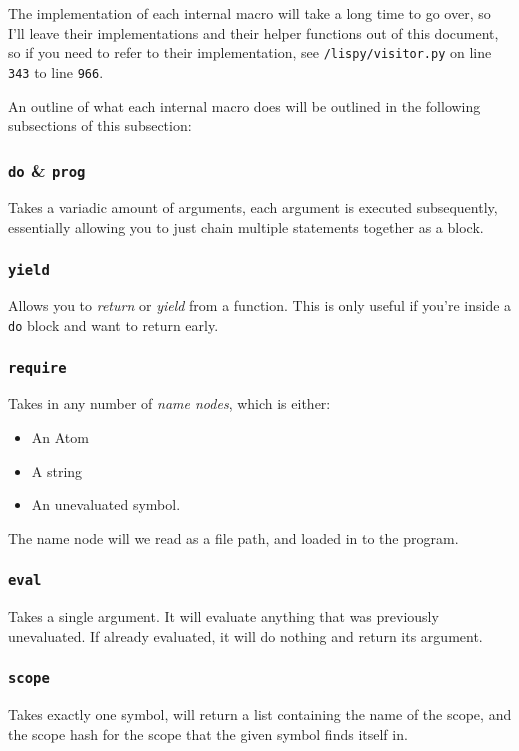 \documentclass{article}
\newcommand{\code}[1]{\texttt{#1}}
\begin{document}
    \clearpage

    The implementation of each internal macro will take a long time to go over,
    so I'll leave their implementations and their helper functions out of this
    document, so if you need to refer to their implementation, see
    \code{/lispy/visitor.py} on line \code{343} to line \code{966}.

    An outline of what each  internal macro does will be outlined in the
    following subsections of this subsection:

    \subsubsection{\code{do} \& \code{prog}}
      Takes a variadic amount of arguments, each argument is executed
      subsequently, essentially allowing you to just chain multiple
      statements together as a block.

    \subsubsection{\code{yield}}
      Allows you to \emph{return} or \emph{yield} from a function.
      This is only useful if you're inside a \code{do} block and want
      to return early.

    \subsubsection{\code{require}}
      Takes in any number of \emph{name nodes}, which is either:
      \begin{itemize}
        \item An Atom
        \item A string
        \item An unevaluated symbol.
      \end{itemize}

      The name node will we read as a file path, and loaded in to the program.

    \subsubsection{\code{eval}}
      Takes a single argument.  It will evaluate anything that was
      previously unevaluated. If already evaluated, it will do nothing and
      return its argument.

    \subsubsection{\code{scope}}
      Takes exactly one symbol, will return a list containing the name of the
      scope, and the scope hash for the scope that the given symbol finds
      itself in.
\end{document}
